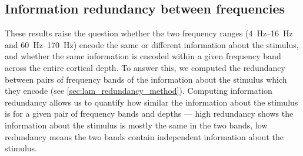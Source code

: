 \subsection{Information redundancy between frequencies}
\label{sec:lam_redundancy}

These results raise the question whether the two frequency ranges (\SIrange{4}{16}{Hz} and \SIrange{60}{170}{Hz}) encode the same or different information about the stimulus, and whether the same information is encoded within a given frequency band across the entire cortical depth. 
To answer this, we computed the redundancy between pairs of frequency bands of the information about the stimulus which they encode (see \autoref{sec:lam_redundancy_method}).
Computing information redundancy allows us to quantify how similar the information about the stimulus is for a given pair of frequency bands and depths --- high redundancy shows the information about the stimulus is mostly the same in the two bands, low redundancy means the two bands contain independent information about the stimulus.

